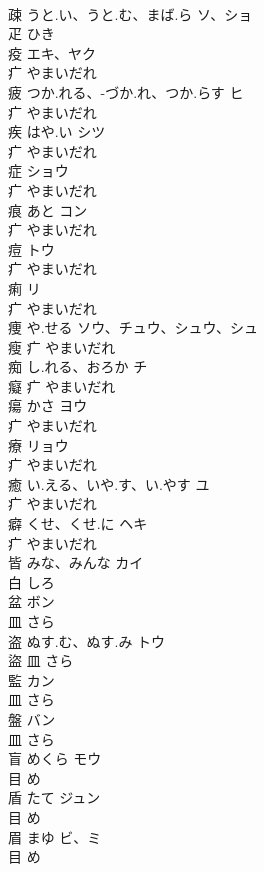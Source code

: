 \documentclass[8pt]{extreport}
\begin{document}
\begin{CJK}{UTF8}{min}
\\	疎	うと.い、うと.む、まば.ら	ソ、ショ	
\\	疋		ひき		
\\	疫		エキ、ヤク	
\\	疒		やまいだれ		
\\	疲	つか.れる、-づか.れ、つか.らす	ヒ	
\\	疒		やまいだれ		
\\	疾	はや.い	シツ	
\\	疒		やまいだれ		
\\	症		ショウ	
\\	疒		やまいだれ		
\\	痕	あと	コン	
\\	疒		やまいだれ		
\\	痘		トウ	
\\	疒		やまいだれ		
\\	痢		リ	
\\	疒		やまいだれ		
\\	痩	や.せる	ソウ、チュウ、シュウ、シュ	
\\	瘦	疒		やまいだれ		
\\	痴	し.れる、おろか	チ	
\\	癡	疒		やまいだれ		
\\	瘍	かさ	ヨウ	
\\	疒		やまいだれ		
\\	療		リョウ	
\\	疒		やまいだれ		
\\	癒	い.える、いや.す、い.やす	ユ	
\\	疒		やまいだれ		
\\	癖	くせ、くせ.に	ヘキ	
\\	疒		やまいだれ		
\\	皆	みな、みんな	カイ	
\\	白		しろ		
\\	盆		ボン	
\\	皿		さら		
\\	盗	ぬす.む、ぬす.み	トウ	
\\	盜	皿		さら		
\\	監		カン	
\\	皿		さら		
\\	盤		バン	
\\	皿		さら		
\\	盲	めくら	モウ	
\\	目		め		
\\	盾	たて	ジュン	
\\	目		め		
\\	眉	まゆ	ビ、ミ	
\\	目		め		

\end{CJK}
\end{document}
